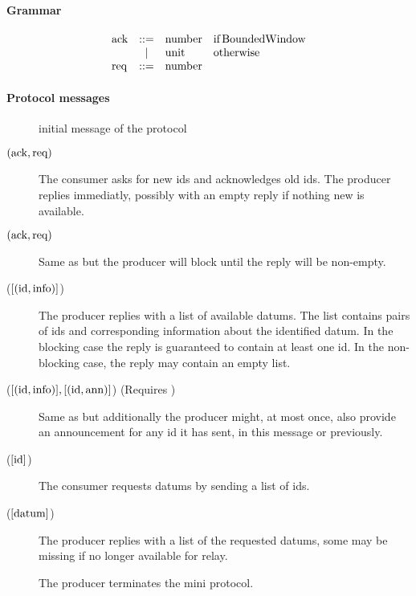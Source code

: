 \paragraph{Grammar}
\[
\begin{array}{l c l l}
\text{ack}{} & ::= & \text{number} & \text{if}\,\text{BoundedWindow}{}\\
       & |  & \text{unit} & \text{otherwise}\\
\text{req}{} & ::= & \text{number} \\
\end{array}
\]
\paragraph{Protocol messages}
\begin{description}
\item [\MsgInit] initial message of the protocol
\item [\MsgRequestIdsNB{} {\boldmath $(\text{ack}{},\text{req}{})$}]
      The consumer asks for new ids and acknowledges old ids.
      The producer replies immediatly, possibly with an empty reply if nothing new is available.
\item [\MsgRequestIdsB{} {\boldmath $(\text{ack}{},\text{req}{})$}]
      Same as \MsgRequestIdsNB{} but the producer will block until the reply will be non-empty.
\item [\MsgReplyIds{} {\boldmath ($[ (\text{id}{}, \text{info}) ]$) }]
      The producer replies with a list of available datums.
      The list contains pairs of ids and corresponding information about the identified datum.
      In the blocking case the reply is guaranteed to contain at least one id.
      In the non-blocking case, the reply may contain an empty list.
\item [\MsgReplyIdsAndAnns{} {($[ (\text{id}{}, \text{info}{}) ], [ (\text{id}{}, \text{ann}{}) ]$) } (Requires \Announcements{})]
      Same as \MsgReplyIds{} but additionally the producer might, at most once, also
      provide an announcement for any id it has sent, in this message or
      previously.
\item [\MsgRequestData{} {\boldmath ($[ \text{id}{} ]$)}]
      The consumer requests datums by sending a list of ids.
\item [\MsgReplyData{} {($[ \text{datum}{} ]$)}]
      The producer replies with a list of the requested datums, some may be missing if no longer available for relay.
\item [\MsgDone{}]
      The producer terminates the mini protocol.
\end{description}

